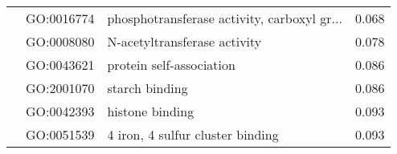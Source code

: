 \begin{longtable}{lllr}
   & GO:0016774 &  phosphotransferase activity, carboxyl gr... &         0.068 \\
   & GO:0008080 &                 N-acetyltransferase activity &         0.078 \\
   & GO:0043621 &                     protein self-association &         0.086 \\
   & GO:2001070 &                               starch binding &         0.086 \\
   & GO:0042393 &                              histone binding &         0.093 \\
   & GO:0051539 &             4 iron, 4 sulfur cluster binding &         0.093 \\
\end{longtable}
